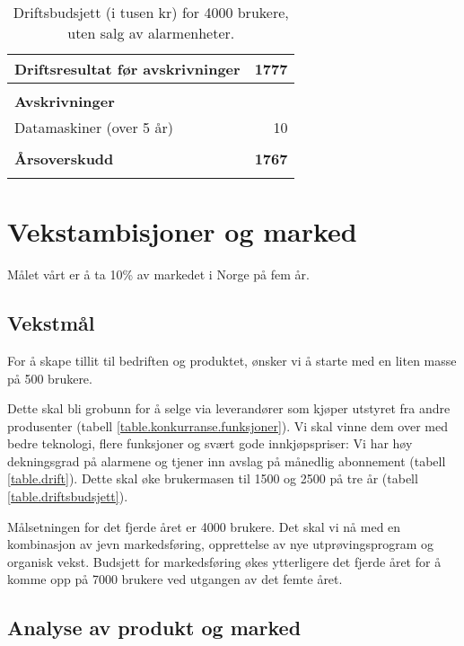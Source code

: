 \begin{table}
\begin{tabular}{lr}
    \\
    \textbf{Driftsresultat før avskrivninger}         &  \textbf{1777} \\
    \hline
    \\
    \textbf{Avskrivninger}                            & \\
    Datamaskiner (over 5 år)                          &    10 \\
    \\
    \textbf{Årsoverskudd}                             &  \textbf{1767} \\
    \thickhline
    \\
  \end{tabular}
  \caption{Driftsbudsjett (i tusen kr) for 4000 brukere, uten salg av alarmenheter.}
  \label{table.drift}
\end{table}

\section{Vekstambisjoner og marked}

Målet vårt er å ta 10\% av markedet i Norge på fem år.

\subsection{Vekstmål}


For å skape tillit til bedriften og produktet, ønsker vi å starte med en liten
masse på 500 brukere.

Dette skal bli grobunn for å selge via leverandører som kjøper utstyret fra
andre produsenter (tabell \vref{table.konkurranse.funksjoner}).  Vi skal vinne
dem over med bedre teknologi, flere funksjoner og svært gode innkjøpspriser: Vi
har høy dekningsgrad på alarmene og tjener inn avslag på månedlig abonnement
(tabell \vref{table.drift}).  Dette skal øke brukermasen til 1500 og 2500 på
tre år (tabell \vref{table.driftsbudsjett}).

Målsetningen for det fjerde året er 4000 brukere. Det skal vi nå med en
kombinasjon av jevn markedsføring, opprettelse av nye utprøvingsprogram og
organisk vekst.  Budsjett for markedsføring økes ytterligere det fjerde året
for å komme opp på 7000 brukere ved utgangen av det femte året.

\subsection{Analyse av produkt og marked}


